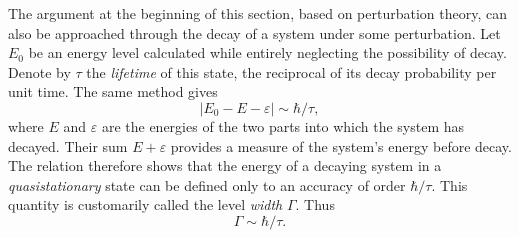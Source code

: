 The argument at the beginning of this section, based on perturbation theory,
can also be approached through the decay of a system under some perturbation.
Let $E_0$ be an energy level calculated while entirely neglecting the
possibility of decay. Denote by $\tau$ the \emph{lifetime} of this state, the
reciprocal of its decay probability per unit time. The same method gives
\begin{equation}
  |E_0-E-\varepsilon|\sim\hbar/\tau,
  \tag{44.6}
\end{equation}
where $E$ and $\varepsilon$ are the energies of the two parts into which the
system has decayed. Their sum $E+\varepsilon$ provides a measure of the
system's energy before decay. The relation therefore shows that the energy of
a decaying system in a \emph{quasistationary} state can be defined only to an
accuracy of order $\hbar/\tau$. This quantity is customarily called the level
\emph{width} $\Gamma$. Thus
\begin{equation}
  \Gamma\sim\hbar/\tau.
  \tag{44.7}
\end{equation}
